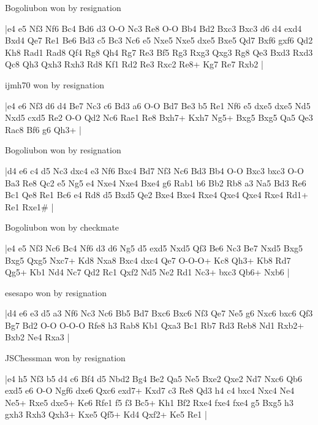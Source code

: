 \showboard

Bogoliubon won by resignation

\makegametitle
|e4 e5 Nf3 Nf6 Bc4 Bd6 d3 O-O Nc3 Re8 O-O Bb4 Bd2 Bxc3 Bxc3 d6 d4 exd4 Bxd4 Qe7 Re1 Be6 Bd3 c5 Bc3 Nc6 e5 Nxe5 Nxe5 dxe5 Bxe5 Qd7 Bxf6 gxf6 Qd2 Kh8 Rad1 Rad8 Qf4 Rg8 Qh4 Rg7 Re3 Bf5 Rg3 Rxg3 Qxg3 Rg8 Qe3 Bxd3 Rxd3 Qc8 Qh3 Qxh3 Rxh3 Rd8 Kf1 Rd2 Re3 Rxc2 Re8+ Kg7 Re7 Rxb2  |

\showboard

ijmh70 won by resignation

\makegametitle
|e4 e6 Nf3 d6 d4 Be7 Nc3 c6 Bd3 a6 O-O Bd7 Be3 b5 Re1 Nf6 e5 dxe5 dxe5 Nd5 Nxd5 cxd5 Re2 O-O Qd2 Nc6 Rae1 Re8 Bxh7+ Kxh7 Ng5+ Bxg5 Bxg5 Qa5 Qe3 Rac8 Bf6 g6 Qh3+  |

\showboard

Bogoliubon won by resignation

\makegametitle
|d4 e6 c4 d5 Nc3 dxc4 e3 Nf6 Bxc4 Bd7 Nf3 Nc6 Bd3 Bb4 O-O Bxc3 bxc3 O-O Ba3 Re8 Qc2 e5 Ng5 e4 Nxe4 Nxe4 Bxe4 g6 Rab1 b6 Bb2 Rb8 a3 Na5 Bd3 Re6 Bc1 Qe8 Re1 Bc6 e4 Rd8 d5 Bxd5 Qe2 Bxe4 Bxe4 Rxe4 Qxe4 Qxe4 Rxe4 Rd1+ Re1 Rxe1\#  |

\showboard

Bogoliubon won by checkmate

\makegametitle
|e4 e5 Nf3 Nc6 Bc4 Nf6 d3 d6 Ng5 d5 exd5 Nxd5 Qf3 Be6 Nc3 Be7 Nxd5 Bxg5 Bxg5 Qxg5 Nxc7+ Kd8 Nxa8 Bxc4 dxc4 Qe7 O-O-O+ Kc8 Qh3+ Kb8 Rd7 Qg5+ Kb1 Nd4 Nc7 Qd2 Rc1 Qxf2 Nd5 Ne2 Rd1 Nc3+ bxc3 Qb6+ Nxb6  |

\showboard

esesapo won by resignation

\makegametitle
|d4 e6 e3 d5 a3 Nf6 Nc3 Nc6 Bb5 Bd7 Bxc6 Bxc6 Nf3 Qe7 Ne5 g6 Nxc6 bxc6 Qf3 Bg7 Bd2 O-O O-O-O Rfe8 h3 Rab8 Kb1 Qxa3 Bc1 Rb7 Rd3 Reb8 Nd1 Rxb2+ Bxb2 Ne4 Rxa3  |

\showboard

JSChessman won by resignation

\makegametitle
|e4 h5 Nf3 b5 d4 c6 Bf4 d5 Nbd2 Bg4 Be2 Qa5 Ne5 Bxe2 Qxe2 Nd7 Nxc6 Qb6 exd5 e6 O-O Ngf6 dxe6 Qxc6 exd7+ Kxd7 c3 Re8 Qd3 h4 c4 bxc4 Nxc4 Ne4 Ne5+ Rxe5 dxe5+ Ke6 Rfe1 f5 f3 Bc5+ Kh1 Bf2 Rxe4 fxe4 fxe4 g5 Bxg5 h3 gxh3 Rxh3 Qxh3+ Kxe5 Qf5+ Kd4 Qxf2+ Ke5 Re1  |

